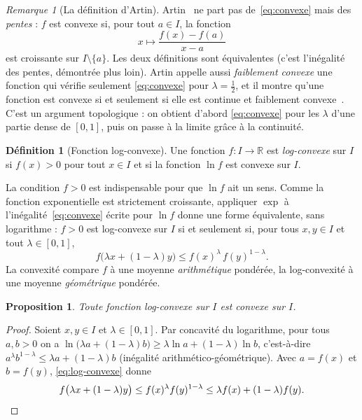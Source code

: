 \documentclass[11pt,a4paper]{amsart}
\theoremstyle{plain}
\newtheorem{proposition}[theoreme]{Proposition}
\theoremstyle{definition}
\newtheorem{definition}[theoreme]{Définition}
\theoremstyle{remark}
\newtheorem{remarque}[theoreme]{Remarque}
\numberwithin{equation}{section}
\newcommand{\R}{\mathbb{R}}
\begin{document}
\begin{remarque}[La définition d'Artin]\label{rem:def-artin}
Artin~\cite[p.~1]{artin} ne part pas de~\eqref{eq:convexe} mais des
\emph{pentes} : $f$ est convexe si, pour tout $a\in I$, la fonction
\[
  x\longmapsto \frac{f(x)-f(a)}{x-a}
\]
est croissante sur $I\setminus\{a\}$. Les deux définitions sont équivalentes
(c'est l'inégalité des pentes, démontrée plus loin). Artin appelle
aussi \emph{faiblement convexe} une fonction qui vérifie seulement
\eqref{eq:convexe} pour $\lambda=\frac12$, et il montre qu'une fonction est
convexe si et seulement si elle est continue et faiblement
convexe~\cite[th.~1.5]{artin}. C'est un argument topologique : on obtient
d'abord \eqref{eq:convexe} pour les $\lambda$ d'une partie dense de
$[0,1]$, puis on passe à la limite grâce à la continuité.
\end{remarque}

\begin{definition}[Fonction log-convexe]\label{def:log-convexe}
Une fonction $f\colon I\to\R$ est \emph{log-convexe} sur $I$ si $f(x)>0$
pour tout $x\in I$ et si la fonction $\ln f$ est convexe sur $I$.
\end{definition}

La condition $f>0$ est indispensable pour que $\ln f$ ait un sens. Comme la
fonction exponentielle est strictement croissante, appliquer $\exp$ à
l'inégalité~\eqref{eq:convexe} écrite pour $\ln f$ donne une forme
équivalente, sans logarithme : $f>0$ est log-convexe sur $I$ si et seulement
si, pour tous $x,y\in I$ et tout $\lambda\in[0,1]$,
\begin{equation}\label{eq:log-convexe}
  f\bigl(\lambda x+(1-\lambda)y\bigr)\le f(x)^{\lambda}\,f(y)^{1-\lambda}.
\end{equation}
La convexité compare $f$ à une moyenne \emph{arithmétique} pondérée, la
log-convexité à une moyenne \emph{géométrique} pondérée.

\begin{proposition}\label{prop:log-convexe-convexe}
Toute fonction log-convexe sur $I$ est convexe sur $I$.
\end{proposition}

\begin{proof}
Soient $x,y\in I$ et $\lambda\in[0,1]$. Par concavité du logarithme,
pour tous $a,b>0$ on a
$\ln\bigl(\lambda a+(1-\lambda)b\bigr)\ge\lambda\ln a+(1-\lambda)\ln b$,
c'est-à-dire $a^\lambda b^{1-\lambda}\le\lambda a+(1-\lambda)b$
(inégalité arithmético-géométrique). Avec $a=f(x)$ et $b=f(y)$,
\eqref{eq:log-convexe} donne
\[
  f\bigl(\lambda x+(1-\lambda)y\bigr)\le f(x)^{\lambda}f(y)^{1-\lambda}
  \le\lambda f(x)+(1-\lambda)f(y).
  \qedhere
\]
\end{proof}
\end{document}
